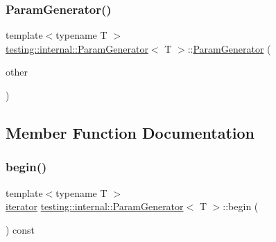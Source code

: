 \mbox{\label{classtesting_1_1internal_1_1ParamGenerator_a5891d25c31919b3099489f8bbcd58b5e}} 
\subsubsection{\texorpdfstring{ParamGenerator()}{ParamGenerator()}\hspace{0.1cm}{\footnotesize\ttfamily [2/2]}}
{\footnotesize\ttfamily template$<$typename T $>$ \\
\mbox{\hyperlink{classtesting_1_1internal_1_1ParamGenerator}{testing\+::internal\+::\+Param\+Generator}}$<$ T $>$\+::\mbox{\hyperlink{classtesting_1_1internal_1_1ParamGenerator}{Param\+Generator}} (\begin{DoxyParamCaption}\item[{const \mbox{\hyperlink{classtesting_1_1internal_1_1ParamGenerator}{Param\+Generator}}$<$ T $>$ \&}]{other }\end{DoxyParamCaption})\hspace{0.3cm}{\ttfamily [inline]}}



\subsection{Member Function Documentation}
\mbox{\label{classtesting_1_1internal_1_1ParamGenerator_a14e735c8bd113556ae905a560cd2d607}} 
\subsubsection{\texorpdfstring{begin()}{begin()}}
{\footnotesize\ttfamily template$<$typename T $>$ \\
\mbox{\hyperlink{classtesting_1_1internal_1_1ParamGenerator_a448b08a8eaae1f1d27840d4dbd66c357}{iterator}} \mbox{\hyperlink{classtesting_1_1internal_1_1ParamGenerator}{testing\+::internal\+::\+Param\+Generator}}$<$ T $>$\+::begin (\begin{DoxyParamCaption}{ }\end{DoxyParamCaption}) const\hspace{0.3cm}{\ttfamily [inline]}}

